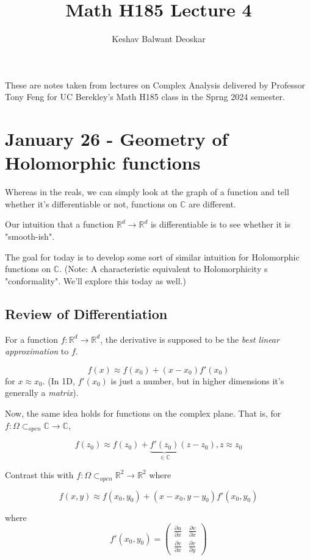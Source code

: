 \documentclass{article}
\title{Math H185 Lecture 4}
\author{Keshav Balwant Deoskar}
\newcommand{\R}{\mathbb{R}}
\newcommand{\C}{\mathbb{C}}
\begin{document}
\maketitle

These are notes taken from lectures on Complex Analysis delivered by Professor Tony Feng for UC Berekley's Math H185 class in the Sprng 2024 semester.

\tableofcontents

\pagebreak

\section{January 26 - Geometry of Holomorphic functions}

\vskip 0.5cm
Whereas in the reals, we can simply look at the graph of a function and tell whether it's differentiable or not, functions on $\C$ are different.

\vskip 0.25cm
Our intuition that a function $\R^d \rightarrow \R^d$ is differentiable is to see whether it is "smooth-ish".

\vskip 0.25cm
The goal for today is to develop some sort of similar intuition for Holomorphic functions on $\C$. (Note: A characteristic equivalent to Holomorphicity s "conformality". We'll explore this today as well.)

\vskip 1cm
\subsection{Review of Differentiation}
For a function $f : \R^d \rightarrow \R^d$, the derivative is supposed to be the \emph{best linear approximation} to $f$.

\[ f(x) \approx f(x_0) + (x - x_0)f'(x_0) \]
for $x \approx x_0$. (In 1D, $f'(x_0)$ is just a number, but in higher dimensions it's generally a \emph{matrix}).


\vskip 0.5cm
Now, the same idea holds for functions on the complex plane. That is, for $f : \Omega \subset_{open} \C \rightarrow \C$,

\[\boxed{ f(z_0) \approx f(z_0) + \underbrace{f'(z_0)}_{\in \C} (z - z_0), z \approx z_0 }\]

\vskip 0.5cm
\begin{dottedbox}
  Contrast this with $f : \Omega \subset_{open} \R^2 \rightarrow \R^2$ where 

  \[ f(x, y) \approx f(x_0, y_0) + (x - x_0, y - y_0)f'(x_0, y_0) \]

  where 
  \[ f'(x_0, y_0) =  \begin{pmatrix}
    \frac{\partial u}{\partial x} & \frac{\partial v}{\partial x} \\
    \frac{\partial v}{\partial x} & \frac{\partial v}{\partial y}
  \end{pmatrix} \]
\end{dottedbox}
\end{document}
